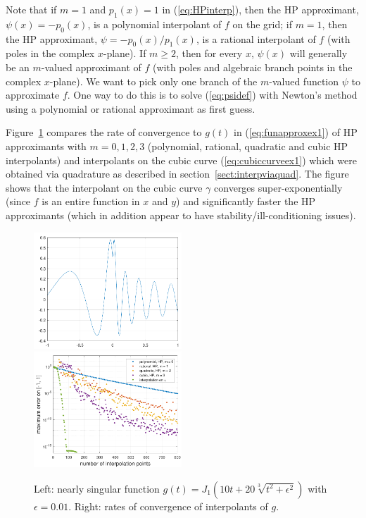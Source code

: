 \documentclass{amsart}
\theoremstyle{remark}
\begin{document}
Note that if $m=1$ and $p_1(x) = 1$ in (\ref{eq:HPinterp}), then the HP approximant, $\psi(x) = -p_0(x)$, is a polynomial interpolant of $f$ on the grid; if $m=1$, then the HP approximant, $\psi = -p_0(x)/p_1(x)$, is a rational interpolant of $f$ (with poles in the complex $x$-plane). If $m \geq 2$, then for every $x$, $\psi(x)$ will generally be an $m$-valued approximant of $f$ (with poles and algebraic branch points in the complex $x$-plane). We want to pick only one branch of the $m$-valued function $\psi$ to approximate $f$. One way to do this is to solve (\ref{eq:psidef}) with Newton's method using a polynomial or rational approximant as first guess. 

Figure~\ref{fig:funapproxex1} compares the rate of convergence to $g(t)$ in (\ref{eq:funapproxex1}) of HP approximants with $m=0, 1, 2, 3$ (polynomial, rational, quadratic and cubic HP interpolants) and interpolants on the cubic curve (\ref{eq:cubiccurveex1}) which were obtained via quadrature as described in section~\ref{sect:interpviaquad}. The figure shows that the interpolant on the cubic curve $\gamma$ converges super-exponentially (since $f$ is an entire function in $x$ and $y$) and significantly faster the HP approximants (which in addition appear to have stability/ill-conditioning issues).

\begin{figure}[ht]
  \begin{center}
    \includegraphics[width=0.495\textwidth]{gplot}
    \includegraphics[width=0.495\textwidth]{fun_approx_bessel_example}
  \end{center} 
  \caption{Left: nearly singular function $g(t) = J_1(10t + 20\sqrt[3]{t^2 + \epsilon^2})$ with $\epsilon = 0.01$. Right:  rates of convergence of interpolants of $g$.  }\label{fig:funapproxex1}
\end{figure}
\end{document}
